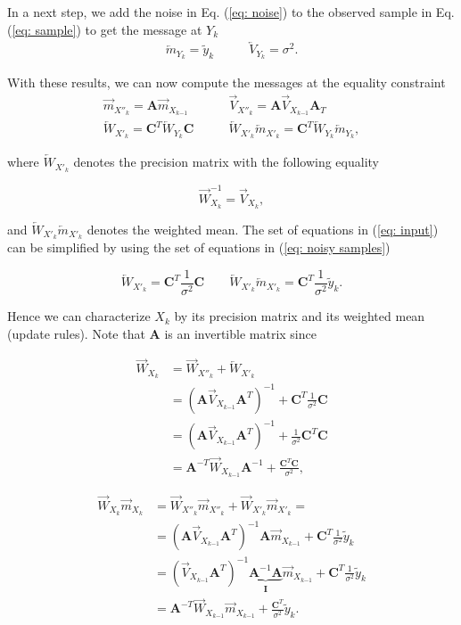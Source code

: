 \documentclass[11pt,a4paper,twoside]{report}
\newcommand{\messF}[3]{\vec{#1}_{{#2}_{k{#3}}}}
\newcommand{\messB}[3]{\overleftarrow{#1}_{{#2}_{k{#3}}}}
\newcommand{\mat}[1]{\mathbf{#1}}
\begin{document}
In a next step, we add the noise in Eq. (\ref{eq: noise}) to the observed sample in Eq. (\ref{eq: sample}) to get the message at $Y_k$
\begin{align}
	\label{eq: noisy samples}
	\messB{m}{Y}{} = \tilde{y}_k \qquad &\messB{V}{Y}{} =  \sigma^2.
\end{align}

With these results, we can now compute the messages at the equality constraint
\begin{align}
	\label{eq: previous state}
	\messF{m}{X''}{} = \mat{A}\messF{m}{X}{-1} \qquad &\messF{V}{X''}{} = \mat{A}\messF{V}{X}{-1}\mat{A}_T \\
	\label{eq: input}
	\messB{W}{X'}{} = \mat{C}^T\messB{W}{Y}{}\mat{C}  \qquad &\messB{W}{X'}{}\messB{m}{X'}{} = \mat{C}^T\messB{W}{Y}{}\messB{m}{Y}{},
\end{align}

where $\messB{W}{X'}{}$ denotes the precision matrix with the following equality

\begin{equation*}
	\messF{W}{X}{}^{-1} = \messF{V}{X}{},
\end{equation*}

and $\messB{W}{X'}{}\messB{m}{X'}{}$ denotes the weighted mean. The set of equations in (\ref{eq: input}) can be simplified by using the set of equations in (\ref{eq: noisy samples})

\begin{equation*}
	\messB{W}{X'}{} = \mat{C}^T\frac{1}{\sigma^2}\mat{C}  \qquad \messB{W}{X'}{}\messB{m}{X'}{} = \mat{C}^T\frac{1}{\sigma^2}\tilde{y}_k.
\end{equation*}


Hence we can characterize $X_k$ by its precision matrix and its weighted mean (update rules). Note that $\mat{A}$ is an invertible matrix since 

\begin{align}
  \label{eq: precision matrix}
  \messF{W}{X}{} &= \messF{W}{X''}{} + \messB{W}{X'}{} \\
  &= \left(\mat{A}\messF{V}{X}{-1}\mat{A}^T\right)^{-1} + \mat{C}^T\frac{1}{\sigma^2}\mat{C} \\
  & = \left(\mat{A}\messF{V}{X}{-1}\mat{A}^T\right)^{-1} + \frac{1}{\sigma^2}\mat{C}^T\mat{C} \\
  & = \mat{A}^{-T}\messF{W}{X}{-1}\mat{A}^{-1} + \frac{\mat{C}^T\mat{C}}{\sigma^2},
\end{align}

\begin{align}
  \label{eq: weighted mean}
  \messF{W}{X}{}\messF{m}{X}{} &= \messF{W}{X''}{}\messF{m}{X''}{} + \messF{W}{X'}{}\messF{m}{X'}{} = \\
  &= \left(\mat{A}\messF{V}{X}{-1}\mat{A}^T\right)^{-1}\mat{A}\messF{m}{X}{-1} + \mat{C}^T\frac{1}{\sigma^2}\tilde{y}_k \\
  &= \left(\messF{V}{X}{-1}\mat{A}^T\right)^{-1}\underbrace{\mat{A}^{-1}\mat{A}}_{\mat{I}}\messF{m}{X}{-1} + \mat{C}^T\frac{1}{\sigma^2}\tilde{y}_k \\
  &= \mat{A}^{-T}\messF{W}{X}{-1}\messF{m}{X}{-1} + \frac{\mat{C}^T}{\sigma^2}\tilde{y}_k.
\end{align}
\end{document}
